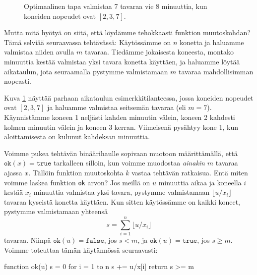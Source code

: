 \begin{figure}
\center
{}
\caption{Optimaalinen tapa valmistaa 7 tavaraa vie 8 minuuttia,
kun koneiden nopeudet ovat $[2,3,7]$.}
\label{fig:optkon}
\end{figure}

Mutta mitä hyötyä on siitä, että löydämme tehokkaasti funktion muutoskohdan?
Tämä selviää seuraavassa tehtävässä:
Käytössämme on $n$ konetta
ja haluamme valmistaa niiden avulla $m$ tavaraa.
Tiedämme jokaisesta koneesta,
montako minuuttia kestää valmistaa yksi tavara konetta käyttäen,
ja haluamme löytää aikataulun, jota seuraamalla pystymme valmistamaan
$m$ tavaraa mahdollisimman nopeasti.

Kuva \ref{fig:optkon} näyttää parhaan aikataulun esimerkkitilanteessa,
jossa koneiden nopeudet ovat $[2,3,7]$ ja haluamme
valmistaa seitsemän tavaraa (eli $m=7$).
Käynnistämme koneen 1 neljästi kahden minuutin välein,
koneen 2 kahdesti kolmen minuutin välein ja koneen 3 kerran.
Viimeisenä pysähtyy kone 1, kun aloittamisesta
on kulunut kahdeksan minuuttia.

Voimme pukea tehtävän binäärihaulle sopivaan muotoon määrittämällä,
että $\texttt{ok}(x)=\texttt{true}$ tarkalleen silloin, kun voimme muodostaa
\emph{ainakin} $m$ tavaraa ajassa $x$.
Tällöin funktion muutoskohta $k$ vastaa tehtävän ratkaisua.
Entä miten voimme laskea funktion \texttt{ok} arvon?
Jos meillä on $u$ minuuttia aikaa ja koneella $i$ kestää $x_i$
minuuttia valmistaa yksi tavara, pystymme valmistamaan
$\lfloor u/x_i \rfloor$ tavaraa kyseistä konetta käyttäen.
Kun sitten käytössämme on kaikki koneet,
pystymme valmistamaan yhteensä
\[ s = \sum_{i=1}^n \lfloor u/x_i \rfloor \]
tavaraa. Niinpä $\texttt{ok}(u)=\texttt{false}$, jos $s<m$,
ja $\texttt{ok}(u)=\texttt{true}$, jos $s \ge m$.
Voimme toteuttaa tämän käytännössä seuraavasti:

\begin{code}
function ok(u)
    s = 0
    for i = 1 to n
        s += u/x[i]
    return s >= m
\end{code}

